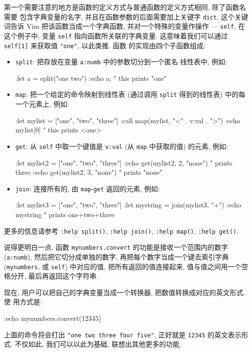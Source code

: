 第一个需要注意的地方是函数的定义方式与普通函数的定义方式相同, 除了函数名需要
包含字典变量的名字, 并且在函数参数的后面需要加上关键字 \texttt{dict}.
这个关键词告诉 Vim 把该函数当成一个字典函数, 并对一个特殊的变量作操作 ---
\texttt{self}, 在这个例子中, 变量 \texttt{self} 指向函数所关联的字典变量.
这意味着我们可以通过 \texttt{self[1]} 来获取值 \texttt{"one"}, 以此类推. 函数
的实现由四个子函数组成:
\begin{itemize}
    \item \texttt{split}: 把存放在变量 \texttt{a:numb} 中的参数切分到一个匿名
        线性表中, 例如:
\begin{vimcode}
:let a = split("one two")
:echo a;    " this prints "one"
\end{vimcode}
\item \texttt{map}: 把一个给定的命令映射到线性表 (通过调用 \texttt{split}
    得到的线性表) 中的每一个元素上, 例如:
\begin{vimcode}
:let mylist = ["one", "two", "three"]
:call map(mylist, "<" . v:val . ">")
:echo mylist[0] " this prints <one>
\end{vimcode}
\item \texttt{get}: 从 \texttt{self} 中取一个键值是 \texttt{v:val} (从
    \texttt{map} 中获取的值) 的元素, 例如:
\begin{vimcode}
:let mylist2 = ["one", "two", "three"]
:echo get(mylist2, 2, "none") " prints three
:echo get(mylist2, 3, "none") " prints "none"
\end{vimcode}
\item \texttt{join}: 连接所有的, 由 \texttt{map}-\texttt{get} 返回的元素,
    例如:
\begin{vimcode}
:let mylist3 = ["one", "two", "three"]
:let mystring = join(mylist3, "+")
:echo mystring " prints one+two+three
\end{vimcode}
\end{itemize}
更多的信息请参考 \texttt{:help split()}, \texttt{:help join()},
\texttt{:help map()}, \texttt{:help get()}.

说得更明白一点, 函数 \texttt{mynumbers.convert} 的功能是接收一个范围内的数字
(\texttt{a:numb}), 然后把它切分成单独的数字, 再把每个数字当成一个键去索引字典
(\texttt{mynumbers}, 或 \texttt{self}) 中对应的值, 把所有返回的值连接起来,
值与值之间用一个空格分开, 最后再返回这个字符串.

现在, 用户可以把自己的字典变量当成一个转换器, 把数值转换成对应的英文形式, 使
用方式是:
\begin{vimcode}
:echo mynumbers.convert(12345)
\end{vimcode}
上面的命令将会打出 \texttt{"one two three four five"}, 正好就是 \texttt{12345}
的英文表示形式. 不仅如此, 我们可以以此为基础, 联想出其他更多的功能.

